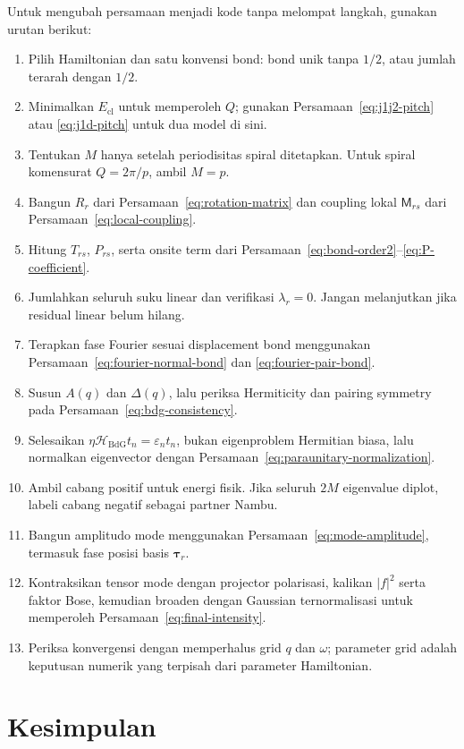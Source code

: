 \documentclass[11pt,a4paper]{article}
\newcommand{\mM}{\mathsf M}
\newcommand{\mH}{\mathcal H}
\begin{document}
Untuk mengubah persamaan menjadi kode tanpa melompat langkah, gunakan urutan berikut:
\begin{enumerate}
\item Pilih Hamiltonian dan satu konvensi bond: bond unik tanpa $1/2$, atau jumlah terarah dengan $1/2$.
\item Minimalkan $E_{\mathrm{cl}}$ untuk memperoleh $Q$; gunakan Persamaan~\eqref{eq:j1j2-pitch} atau \eqref{eq:j1d-pitch} untuk dua model di sini.
\item Tentukan $M$ hanya setelah periodisitas spiral ditetapkan. Untuk spiral komensurat $Q=2\pi/p$, ambil $M=p$.
\item Bangun $R_r$ dari Persamaan~\eqref{eq:rotation-matrix} dan coupling lokal $\mM_{rs}$ dari Persamaan~\eqref{eq:local-coupling}.
\item Hitung $T_{rs}$, $P_{rs}$, serta onsite term dari Persamaan~\eqref{eq:bond-order2}--\eqref{eq:P-coefficient}.
\item Jumlahkan seluruh suku linear dan verifikasi $\lambda_r=0$. Jangan melanjutkan jika residual linear belum hilang.
\item Terapkan fase Fourier sesuai displacement bond menggunakan Persamaan~\eqref{eq:fourier-normal-bond} dan \eqref{eq:fourier-pair-bond}.
\item Susun $A(q)$ dan $\Delta(q)$, lalu periksa Hermiticity dan pairing symmetry pada Persamaan~\eqref{eq:bdg-consistency}.
\item Selesaikan $\eta\mH_{\mathrm{BdG}}t_n=\varepsilon_nt_n$, bukan eigenproblem Hermitian biasa, lalu normalkan eigenvector dengan Persamaan~\eqref{eq:paraunitary-normalization}.
\item Ambil cabang positif untuk energi fisik. Jika seluruh $2M$ eigenvalue diplot, labeli cabang negatif sebagai partner Nambu.
\item Bangun amplitudo mode menggunakan Persamaan~\eqref{eq:mode-amplitude}, termasuk fase posisi basis $\bm\tau_r$.
\item Kontraksikan tensor mode dengan projector polarisasi, kalikan $|f|^2$ serta faktor Bose, kemudian broaden dengan Gaussian ternormalisasi untuk memperoleh Persamaan~\eqref{eq:final-intensity}.
\item Periksa konvergensi dengan memperhalus grid $q$ dan $\omega$; parameter grid adalah keputusan numerik yang terpisah dari parameter Hamiltonian.
\end{enumerate}

\section{Kesimpulan}
\end{document}
